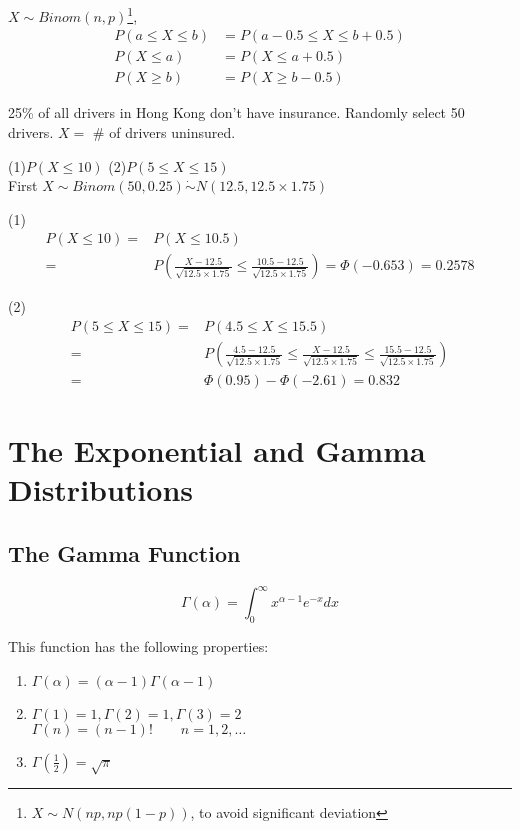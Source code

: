 $X \sim Binom(n,p)$\footnote{$X \sim N(np,np(1-p))$, to avoid significant deviation},
\begin{align*}
P(a \leq X \leq b)&=P(a-0.5 \leq X \leq b+0.5)  \\
P(X \leq a) &= P(X \leq a+0.5)	\\
P(X \geq b) &= P(X \geq b-0.5)
\end{align*}

\begin{exmp}
25\% of all drivers in Hong Kong don't have insurance. Randomly select 50 drivers. $X=$ \# of drivers uninsured.

(1)$P(X \leq 10)$ \quad (2)$P(5 \leq X \leq 15)$ \\
First $X\sim Binom(50,0.25) \dot{\sim} N(12.5,12.5\times1.75)$

(1) \begin{align*}
P(X\leq 10) =& P(X \leq 10.5) \\
=& P\left( \frac{X-12.5}{\sqrt{12.5\times1.75}}  \leq   \frac{10.5-12.5}{\sqrt{12.5\times1.75}}\right)=\Phi(-0.653)=0.2578
\end{align*}

(2) \begin{align*}
P(5 \leq X\leq 15) =& P(4.5 \leq X \leq 15.5) \\
=& P\left(\frac{4.5-12.5}{\sqrt{12.5\times1.75}} \leq \frac{X-12.5}{\sqrt{12.5\times1.75}}  \leq   \frac{15.5-12.5}{\sqrt{12.5\times1.75}}\right)	\\
=&\Phi(0.95)-\Phi(-2.61)=0.832
\end{align*}
\end{exmp}

\section{The Exponential and Gamma Distributions}
\subsection{The Gamma Function}
\begin{defn}
\[\Gamma(\alpha)=\int_0^{\infty} x^{\alpha-1}e^{-x} dx\]
\end{defn}

This function has the following properties:
\begin{enumerate}
\item $\Gamma(\alpha)=(\alpha-1)\Gamma(\alpha-1)$
\item $\Gamma(1)=1,\Gamma(2)=1,\Gamma(3)=2$\\
$\Gamma(n)=(n-1)! \qquad n=1,2,\dots$
\item $\Gamma(\frac{1}{2})=\sqrt{\pi}$
\end{enumerate}

